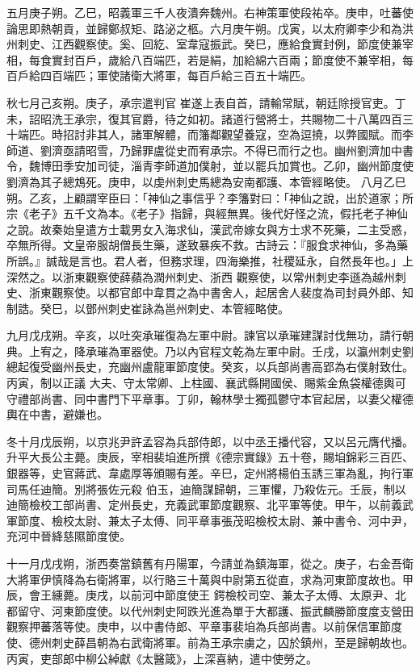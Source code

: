 \begin{pinyinscope}
 五月庚子朔。乙巳，昭義軍三千人夜潰奔魏州。右神策軍使段祐卒。庚申，吐蕃使論思即熱朝貢，並歸鄭叔矩、路泌之柩。六月庚午朔。戊寅，以太府卿李少和為洪州刺史、江西觀察使。奚、回紇、室韋寇振武。癸巳，應給食實封例，節度使兼宰相，每食實封百戶，歲給八百端匹，若是絹，加給綿六百兩；節度使不兼宰相，每百戶給四百端匹；軍使諸衛大將軍，每百戶給三百五十端匹。



 秋七月己亥朔。庚子，承宗遣判官
 崔遂上表自首，請輸常賦，朝廷除授官吏。丁未，詔昭洗王承宗，復其官爵，待之如初。諸道行營將士，共賜物二十八萬四百三十端匹。時招討非其人，諸軍解體，而籓鄰觀望養寇，空為逗撓，以弊國賦。而李師道、劉濟亟請昭雪，乃歸罪盧從史而宥承宗。不得已而行之也。幽州劉濟加中書令，魏博田季安加司徒，淄青李師道加僕射，並以罷兵加賞也。乙卯，幽州節度使劉濟為其子總鴆死。庚申，以虔州刺史馬總為安南都護、本管經略使。
 八月乙巳朔。乙亥，上顧謂宰臣曰：「神仙之事信乎？李籓對曰：「神仙之說，出於道家；所宗《老子》五千文為本。《老子》指歸，與經無異。後代好怪之流，假托老子神仙之說。故秦始皇遣方士載男女入海求仙，漢武帝嫁女與方士求不死藥，二主受惑，卒無所得。文皇帝服胡僧長生藥，遂致暴疾不救。古詩云：『服食求神仙，多為藥所誤。』誠哉是言也。君人者，但務求理，四海樂推，社稷延永，自然長年也。」上深然之。以浙東觀察使薛蘋為潤州刺史、浙西
 觀察使，以常州刺史李遜為越州刺史、浙東觀察使。以都官郎中韋貫之為中書舍人，起居舍人裴度為司封員外郎、知制誥。癸巳，以鄧州刺史崔詠為邕州刺史、本管經略使。



 九月戊戌朔。辛亥，以吐突承璀復為左軍中尉。諫官以承璀建謀討伐無功，請行朝典。上宥之，降承璀為軍器使。乃以內官程文乾為左軍中尉。壬戌，以瀛州刺史劉總起復受幽州長史，充幽州盧龍軍節度使。癸亥，以兵部尚書高郢為右僕射致仕。丙寅，制以正議
 大夫、守太常卿、上柱國、襄武縣開國侯、賜紫金魚袋權德輿可守禮部尚書、同中書門下平章事。丁卯，翰林學士獨孤鬱守本官起居，以妻父權德輿在中書，避嫌也。



 冬十月戊辰朔，以京兆尹許孟容為兵部侍郎，以中丞王播代容，又以呂元膺代播。升平大長公主薨。庚辰，宰相裴垍進所撰《德宗實錄》五十卷，賜垍錦彩三百匹、銀器等，史官蔣武、韋處厚等頒賜有差。辛巳，定州將楊伯玉誘三軍為亂，拘行軍司馬任迪簡。別將張佐元殺
 伯玉，迪簡謀歸朝，三軍懼，乃殺佐元。壬辰，制以迪簡檢校工部尚書、定州長史，充義武軍節度觀察、北平軍等使。甲午，以前義武軍節度、檢校太尉、兼太子太傅、同平章事張茂昭檢校太尉、兼中書令、河中尹，充河中晉絳慈隰節度使。



 十一月戊戌朔，浙西奏當鎮舊有丹陽軍，今請並為鎮海軍，從之。庚子，右金吾衛大將軍伊慎降為右衛將軍，以行賂三十萬與中尉第五從直，求為河東節度故也。甲辰，會王纁薨。庚戌，以前河中節度使王
 鍔檢校司空、兼太子太傅、太原尹、北都留守、河東節度使。以代州刺史阿跌光進為單于大都護、振武麟勝節度度支營田觀察押蕃落等使。庚申，以中書侍郎、平章事裴垍為兵部尚書。以前保信軍節度使、德州刺史薛昌朝為右武衛將軍。前為王承宗虜之，囚於鎮州，至是歸朝故也。丙寅，吏部郎中柳公綽獻《太醫箴》，上深喜納，遣中使勞之。




\end{pinyinscope}
